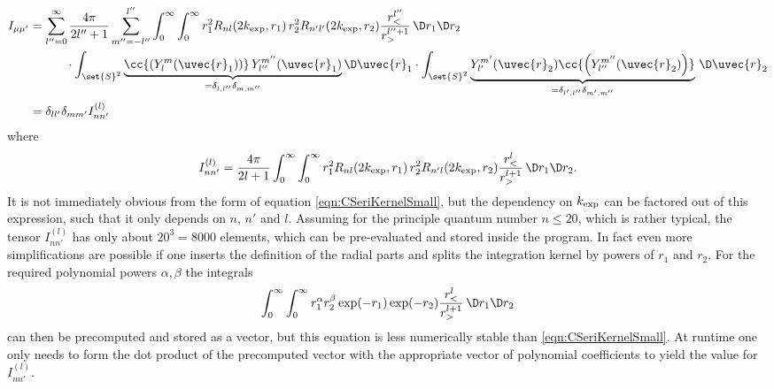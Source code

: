 \begin{equation}
\begin{aligned}
	I_{\mu\mu'}
	&= \sum_{l''=0}^{\infty}\frac{4\pi}{2l''+1}
	\sum_{m''=-l''}^{l''}
	\int_0^\infty \int_0^\infty
	r_1^2 R_{nl}(2\kexp,r_1) \, r_2^2 R_{n'l'}(2\kexp,r_2) \frac{r^{l''}_<}{r_>^{l'' + 1}}
	\, \D r_1  \D r_2 \\
	&\hspace{30pt}
	\cdot \int_{\set{S}^2}
		\underbrace{\cc{\left(Y_l^m(\uvec{r}_1)\right)} \, Y_{l''}^{m''}(\uvec{r}_1)}
		_{=\delta_{l,l''}\delta_{m,m''}}
		\D \uvec{r}_1
	\cdot \int_{\set{S}^2}
		\underbrace{Y_{l'}^{m'}(\uvec{r}_2) \cc{\left(Y_{l''}^{m''}(\uvec{r}_2)\right)}}
		_{=\delta_{l',l''}\delta_{m',m''}}
		\, \D \uvec{r}_2 \\
	&= \delta_{ll'} \delta_{mm'} I^{(l)}_{nn'}
\end{aligned}
\label{eqn:CSeriKernel}
\end{equation}
where
\begin{equation}
	I^{(l)}_{nn'}
	= \frac{4\pi}{2l+1}
	\int_0^\infty \int_0^\infty
	r_1^2 R_{nl}(2\kexp,r_1) \, r_2^2 R_{n'l}(2\kexp,r_2) \frac{r^{l}_<}{r_>^{l + 1}}
	\, \D r_1  \D r_2.
	\label{eqn:CSeriKernelSmall}
\end{equation}
It is not immediately obvious from the form of equation \eqref{eqn:CSeriKernelSmall},
but the dependency on $k_\text{exp}$ can be factored out of this expression,
such that it only depends on $n$, $n'$ and $l$.
Assuming for the principle quantum number $n \leq 20$, which is rather typical,
the tensor $I^{(l)}_{nn'}$ has only about $20^3 = 8000$ elements,
which can be pre-evaluated and stored inside the program.
In fact even more simplifications are possible if one inserts
the definition of the radial parts and splits the integration kernel by powers of
$r_1$ and $r_2$.
For the required polynomial powers $\alpha, \beta$ the integrals
\[ \int_0^\infty \int_0^\infty r_1^\alpha r_2^\beta \exp(-r_1) \exp(-r_2)
	\frac{r^{l}_<}{r_>^{l + 1}} \, \D r_1  \D r_2 \]
can then be precomputed and stored as a vector,
but this equation is less numerically stable than \eqref{eqn:CSeriKernelSmall}.
At runtime one only needs to form the dot product of the precomputed vector
with the appropriate vector of polynomial coefficients
to yield the value for $I^{(l)}_{nn'}$.

